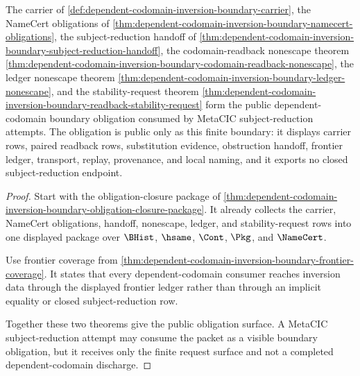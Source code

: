 \begin{theorem}
\label{thm:dependent-codomain-inversion-boundary-public-obligation}
The carrier of \autoref{def:dependent-codomain-inversion-boundary-carrier}, the NameCert obligations of \autoref{thm:dependent-codomain-inversion-boundary-namecert-obligations}, the subject-reduction handoff of \autoref{thm:dependent-codomain-inversion-boundary-subject-reduction-handoff}, the codomain-readback nonescape theorem \autoref{thm:dependent-codomain-inversion-boundary-codomain-readback-nonescape}, the ledger nonescape theorem \autoref{thm:dependent-codomain-inversion-boundary-ledger-nonescape}, and the stability-request theorem \autoref{thm:dependent-codomain-inversion-boundary-readback-stability-request} form the public dependent-codomain boundary obligation consumed by MetaCIC subject-reduction attempts. The obligation is public only as this finite boundary: it displays carrier rows, paired readback rows, substitution evidence, obstruction handoff, frontier ledger, transport, replay, provenance, and local naming, and it exports no closed subject-reduction endpoint.
\end{theorem}
\begin{proof}
Start with the obligation-closure package of \autoref{thm:dependent-codomain-inversion-boundary-obligation-closure-package}. It already collects the carrier, NameCert obligations, handoff, nonescape, ledger, and stability-request rows into one displayed package over $\BHist$, $\hsame$, $\Cont$, $\Pkg$, and $\NameCert$.

Use frontier coverage from \autoref{thm:dependent-codomain-inversion-boundary-frontier-coverage}. It states that every dependent-codomain consumer reaches inversion data through the displayed frontier ledger rather than through an implicit equality or closed subject-reduction row.

Together these two theorems give the public obligation surface. A MetaCIC subject-reduction attempt may consume the packet as a visible boundary obligation, but it receives only the finite request surface and not a completed dependent-codomain discharge.
\end{proof}

